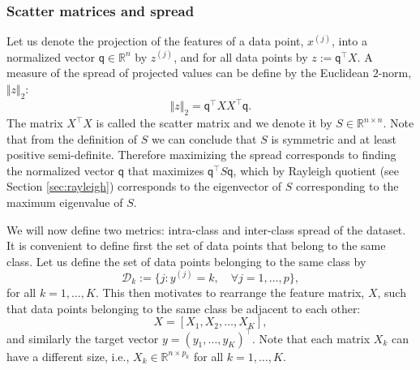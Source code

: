 \documentclass[11pt]{article}
\newcommand{\R}{\mathbb{R}}
\newcommand{\D}{\mathcal{D}}
\newcommand{\q}{\textsf{q}}
\newcommand{\norm}[1]{\Vert #1 \Vert}
\begin{document}
\subsubsection{Scatter matrices and spread}
Let us denote the projection of the features of a data point,
$x^{(j)}$, into a normalized vector $\q \in \R^{n}$ by $z^{(j)}$, and
for all data points by $z := \q^\top X$. A measure of the spread of
projected values can be define by the Euclidean $2$-norm,
$\norm{z}_2$:
\begin{equation}
  \norm{z}_2 = \q^\top X X^\top \q.
\end{equation}
The matrix $X^\top X$ is called the scatter matrix and we denote it by
$S \in \R^{n\times n}$. Note that from the definition of $S$ we can
conclude that $S$ is symmetric and at least positive
semi-definite. Therefore maximizing the spread corresponds to finding
the normalized vector $\q$ that maximizes $\q^\top S \q$, which by
Rayleigh quotient (see Section \ref{sec:rayleigh}) corresponds to the
eigenvector of $S$ corresponding to the maximum eigenvalue of $S$.

We will now define two metrics: intra-class and inter-class spread of
the dataset. It is convenient to define first the set of data points
that belong to the same class. Let us define the set of data points
belonging to the same class by
\begin{equation}
  \D_k := \big\{ j : y^{(j)} = k, \quad \forall j=1,\dots,p \big\},
\end{equation}
for all $k = 1, \dots, K$. This then motivates to rearrange the
feature matrix, $X$, such that data points belonging to the same class
be adjacent to each other:
\begin{equation}
  X = [X_1, X_2, \dots, X_K],
\end{equation}
and similarly the target vector $y = (y_1, \dots, y_K)^\top$. Note
that each matrix $X_k$ can have a different size, i.e., $X_k \in \R^{n
  \times p_k}$ for all $k = 1, \dots, K$.
\end{document}
